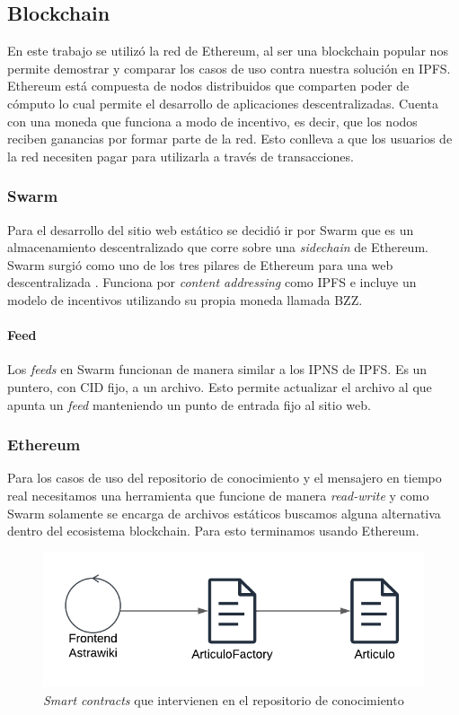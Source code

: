 \subsection{Blockchain}

En este trabajo se utilizó la red de Ethereum, al ser una blockchain popular nos permite demostrar y comparar los casos de uso contra nuestra solución en IPFS. Ethereum está compuesta de nodos distribuidos que comparten poder de cómputo lo cual permite el desarrollo de aplicaciones descentralizadas. Cuenta con una moneda que funciona a modo de incentivo, es decir, que los nodos reciben ganancias por formar parte de la red. Esto conlleva a que los usuarios de la red necesiten pagar para utilizarla a través de transacciones.

\subsubsection{Swarm}

Para el desarrollo del sitio web estático se decidió ir por Swarm que es un almacenamiento descentralizado que corre sobre una \textit{sidechain} de Ethereum. Swarm surgió como uno de los tres pilares de Ethereum para una web descentralizada \parencite{swarm-origin}. Funciona por \textit{content addressing} como IPFS e incluye un modelo de incentivos utilizando su propia moneda llamada BZZ.

\paragraph{Feed}

Los \textit{feeds} en Swarm funcionan de manera similar a los IPNS de IPFS. Es un puntero, con CID fijo, a un archivo. Esto permite actualizar el archivo al que apunta un \textit{feed} manteniendo un punto de entrada fijo al sitio web.

\subsubsection{Ethereum}

Para los casos de uso del repositorio de conocimiento y el mensajero en tiempo real necesitamos una herramienta que funcione de manera \textit{read-write} y como Swarm solamente se encarga de archivos estáticos buscamos alguna alternativa dentro del ecosistema blockchain. Para esto terminamos usando Ethereum.

\begin{figure}[H]
    \centering
    \includegraphics[width=0.5\linewidth]{img/astrawiki-articulo-factory.png}
    \caption{\textit{Smart contracts} que intervienen en el repositorio de conocimiento}
    \label{fig:aw-eth-articulo-factory}
\end{figure}

